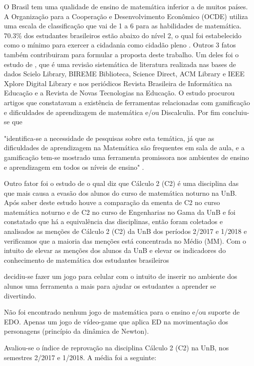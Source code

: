 O Brasil tem uma qualidade de ensino de matemática inferior a de muitos países. A Organização para a Cooperação e Desenvolvimento Econômico (OCDE) utiliza uma escala de classificação que vai de 1 a 6 para as habilidades de matemática. 70.3\% dos estudantes brasileiros estão abaixo do nível 2, o qual foi estabelecido como o mínimo para exercer a cidadania como cidadão pleno \cite{inep2015nivelcidadania}. Outros 3 fatos também contribuiram para formular a proposta deste trabalho. Um deles foi o estudo de \cite{revbibmatgam}, que é uma revisão sistemática de literatura realizada nas bases de dados Scielo Library, BIREME Biblioteca, Science Direct, ACM Library e IEEE Xplore Digital Library e nos periódicos Revista Brasileira de Informática na Educação e a Revista de Novas Tecnologias na Educação. O estudo procurou artigos que constatavam a existência de ferramentas relacionadas com gamificação e dificuldades de aprendizagem de matemática e/ou Discalculia. Por fim concluiu-se que \begin{citacao}"identifica-se a necessidade de pesquisas sobre esta temática, já que as dificuldades de aprendizagem na Matemática são frequentes em sala de aula, e a gamificação tem-se mostrado uma ferramenta promissora nos ambientes de ensino e aprendizagem em todos os níveis de ensino" \cite{revbibmatgam}. \end{citacao} Outro fator foi o estudo de \cite{evasaoC2} o qual diz que Cálculo 2 (C2) é uma disciplina das que mais causa a evasão dos alunos do curso de matemática noturno na UnB. Após saber deste estudo houve a comparação da ementa de C2 no curso matemática noturno e de C2 no curso de Engenharias no Gama da UnB e foi constatado que há a equivalência das disciplinas, então foram coletados e analisados as menções de Cálculo 2 (C2) da UnB dos períodos 2/2017 e 1/2018 e verificamos que a maioria das menções está concentrada no Médio (MM). Com o intuito de elevar as menções dos alunos da UnB e elevar os indicadores do conhecimento de matemática dos estudantes brasileiros 


decidiu-se fazer um jogo para celular com o intuito de inserir no ambiente dos alunos uma ferramenta a mais para ajudar os estudantes a aprender se divertindo. 

Não foi encontrado nenhum jogo de matemática para o ensino e/ou suporte de EDO. Apenas um jogo de vídeo-game que aplica ED na movimentação dos personagens (princípio da dinâmica de Newton)\cite{videoGameED}.

Avaliou-se o índice de reprovação na disciplina Cálculo 2 (C2) na UnB, nos semestres 2/2017 e 1/2018. A média foi a seguinte:

